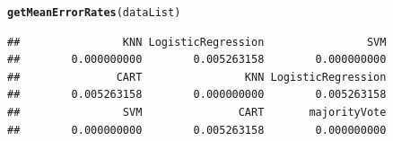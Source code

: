 \documentclass[a4paper,draft=false]{scrreprt}\usepackage[]{graphicx}\usepackage[]{color}
\makeatletter
\newcommand{\hlstd}[1]{\textcolor[rgb]{0.345,0.345,0.345}{#1}}%
\newcommand{\hlkwd}[1]{\textcolor[rgb]{0.737,0.353,0.396}{\textbf{#1}}}%
\newenvironment{kframe}{%
 \def\at@end@of@kframe{}%
 \ifinner\ifhmode%
  \def\at@end@of@kframe{\end{minipage}}%
  \begin{minipage}{\columnwidth}%
 \fi\fi%
 \def\FrameCommand##1{\hskip\@totalleftmargin \hskip-\fboxsep
 \colorbox{shadecolor}{##1}\hskip-\fboxsep
     \hskip-\linewidth \hskip-\@totalleftmargin \hskip\columnwidth}%
 \MakeFramed {\advance\hsize-\width
   \@totalleftmargin\z@ \linewidth\hsize
   \@setminipage}}%
 {\par\unskip\endMakeFramed%
 \at@end@of@kframe}
\newenvironment{knitrout}{}{} %
\makeatother
\begin{document}
\begin{knitrout}
\begin{kframe}
\begin{alltt}
\hlkwd{getMeanErrorRates}\hlstd{(dataList)}
\end{alltt}
\begin{verbatim}
##                KNN LogisticRegression                SVM 
##        0.000000000        0.005263158        0.000000000 
##               CART                KNN LogisticRegression 
##        0.005263158        0.000000000        0.005263158 
##                SVM               CART       majorityVote 
##        0.000000000        0.005263158        0.000000000
\end{verbatim}
\end{kframe}
\end{knitrout}

\nocite{*}


\end{document}
